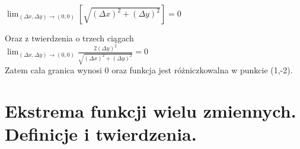 \documentclass[12pt]{article}
\begin{document}
\begin{itemize}
        $ \lim_{(\Delta x, \Delta y) \rightarrow (0,0)} \left[ \sqrt{(\Delta x)^2 + (\Delta y)^2} \right] = 0$\newline

        Oraz z twierdzenia o trzech ciągach\newline
        \\
        $\lim_{(\Delta x, \Delta y) \rightarrow (0,0)} \frac{2(\Delta y)^2}{\sqrt{(\Delta x)^2 + (\Delta y)^2}} = 0 $\newline
        \\
        Zatem cała granica wynosi 0 oraz funkcja jest różniczkowalna w punkcie (1,-2).


    \end{itemize}

    \newpage

    \section{Ekstrema funkcji wielu zmiennych. Definicje i twierdzenia.}
\end{document}
